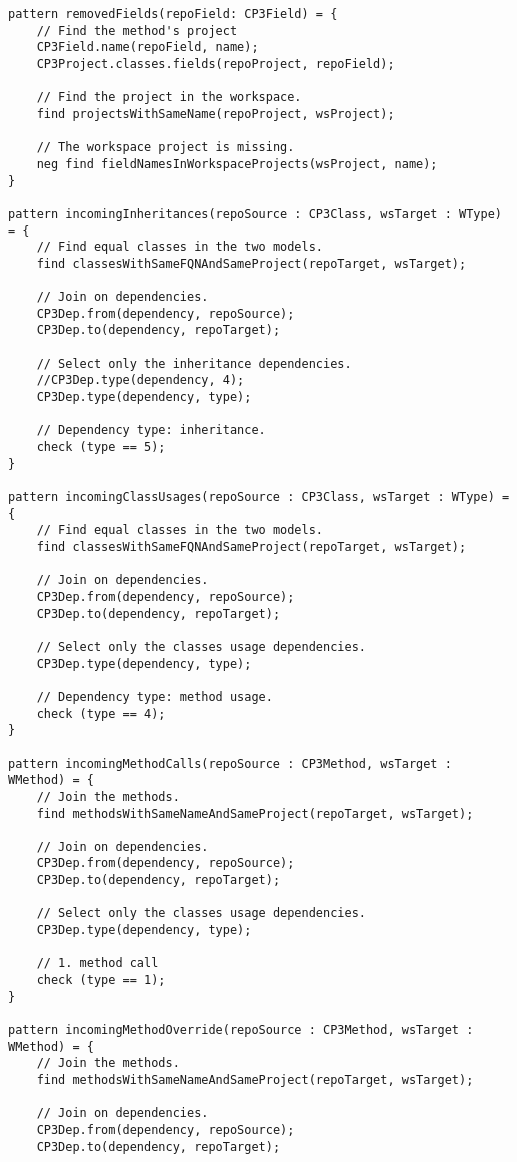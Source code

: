 \begin{lstlisting}
pattern removedFields(repoField: CP3Field) = {
    // Find the method's project
    CP3Field.name(repoField, name);
    CP3Project.classes.fields(repoProject, repoField);

    // Find the project in the workspace.
    find projectsWithSameName(repoProject, wsProject);

    // The workspace project is missing.
    neg find fieldNamesInWorkspaceProjects(wsProject, name);
}

pattern incomingInheritances(repoSource : CP3Class, wsTarget : WType) = {
    // Find equal classes in the two models. 
    find classesWithSameFQNAndSameProject(repoTarget, wsTarget);

    // Join on dependencies.
    CP3Dep.from(dependency, repoSource);
    CP3Dep.to(dependency, repoTarget);

    // Select only the inheritance dependencies.
    //CP3Dep.type(dependency, 4);
    CP3Dep.type(dependency, type);
    
    // Dependency type: inheritance.
    check (type == 5);
}

pattern incomingClassUsages(repoSource : CP3Class, wsTarget : WType) = {
    // Find equal classes in the two models. 
    find classesWithSameFQNAndSameProject(repoTarget, wsTarget);

    // Join on dependencies.
    CP3Dep.from(dependency, repoSource);
    CP3Dep.to(dependency, repoTarget);

    // Select only the classes usage dependencies.
    CP3Dep.type(dependency, type);
    
    // Dependency type: method usage.
    check (type == 4);
}

pattern incomingMethodCalls(repoSource : CP3Method, wsTarget : WMethod) = {
    // Join the methods.
    find methodsWithSameNameAndSameProject(repoTarget, wsTarget);

    // Join on dependencies.
    CP3Dep.from(dependency, repoSource);
    CP3Dep.to(dependency, repoTarget);

    // Select only the classes usage dependencies.
    CP3Dep.type(dependency, type);
    
    // 1. method call
    check (type == 1);
}

pattern incomingMethodOverride(repoSource : CP3Method, wsTarget : WMethod) = {
    // Join the methods.
    find methodsWithSameNameAndSameProject(repoTarget, wsTarget);

    // Join on dependencies.
    CP3Dep.from(dependency, repoSource);
    CP3Dep.to(dependency, repoTarget);


\end{lstlisting}
